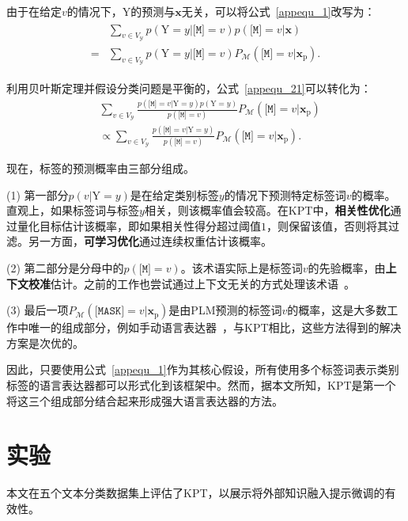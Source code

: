 由于在给定$v$的情况下，Y的预测与$\mathbf{x}$无关，可以将公式~\eqref{appequ_1}改写为：
\begin{align}
\begin{split}
 &\sum_{v\in V_{\mathcal{Y}}} p(\text{Y}=y|\texttt{[M]}\!\!\!=\!v) p(\texttt{[M]}\!\!\!=\!v|\mathbf{x}) \\ 
 = & \sum_{v\in V_{\mathcal{Y}}}  p(\text{Y}=y|\texttt{[M]}\!\!\!=\!v) P_{\mathcal{M}}(\texttt{[M]}\!\!\!=\!v|\mathbf{x}_{\text{p}}).
 \end{split}
\label{appequ_21}
\end{align}

利用贝叶斯定理并假设分类问题是平衡的，公式~\eqref{appequ_21}可以转化为：
\begin{align}\label{appequ_2}
 &\sum_{v\in V_{\mathcal{Y}}} \frac{p(\texttt{[M]}\!\!\!=\!v|\text{Y}=y)p(\text{Y}=y) }{p(\texttt{[M]}\!\!\!=\!v)} P_{\mathcal{M}}(\texttt{[M]}\!\!\!=\!v|\mathbf{x}_{\text{p}})\nonumber\\
 &\propto \!\! \sum_{v\in V_{\mathcal{Y}}}\! \frac{p(\texttt{[M]}\!\!\!=\!v|\text{Y}=y)}{p(\texttt{[M]}\!\!\!=\!v)} P_{\mathcal{M}}(\texttt{[M]}\!\!\!=\!v|\mathbf{x}_{\text{p}}). 
\end{align}

现在，标签的预测概率由三部分组成。

(1) 第一部分$p(v|\text{Y}=y)$是在给定类别标签$y$的情况下预测特定标签词$v$的概率。直观上，如果标签词与标签$y$相关，则该概率值会较高。在KPT中，\textbf{相关性优化}通过量化目标估计该概率，即如果相关性得分超过阈值$1$，则保留该值，否则将其过滤。另一方面，\textbf{可学习优化}通过连续权重估计该概率。

(2) 第二部分是分母中的$p(\texttt{[M]}\!\!\!=\!v)$。该术语实际上是标签词$v$的先验概率，由\textbf{上下文校准}估计。之前的工作也尝试通过上下文无关的方式处理该术语~\cite{holtzman2021surface, pmlr-v139-zhao21c}。

(3) 最后一项$P_{\mathcal{M}}(\texttt{[MASK]}\!\!\!=\!v|\mathbf{x}_{\text{p}})$是由PLM预测的标签词$v$的概率，这是大多数工作中唯一的组成部分，例如手动语言表达器~\cite{schick2020exploiting}，与KPT相比，这些方法得到的解决方案是次优的。

因此，只要使用公式~\eqref{appequ_1}作为其核心假设，所有使用多个标签词表示类别标签的语言表达器都可以形式化到该框架中。然而，据本文所知，KPT是第一个将这三个组成部分结合起来形成强大语言表达器的方法。



\section{实验}
本文在五个文本分类数据集上评估了KPT，以展示将外部知识融入提示微调的有效性。

